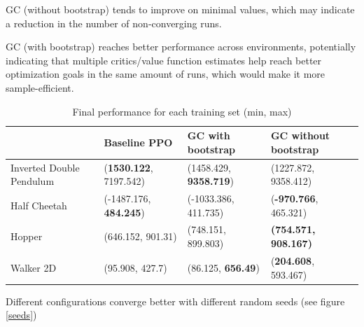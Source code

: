GC (without bootstrap) tends to improve on minimal values, which may indicate a reduction in the number of non-converging runs.

GC (with bootstrap) reaches better performance across environments, potentially indicating that multiple critics/value function estimates help reach better optimization goals in the same amount of runs, which would make it more sample-efficient.


\begin{table}
  \begin{center}
\begin{tabular}{p{}|p{}p{}p{}}
    \hline
    & Baseline PPO & GC with bootstrap & GC without bootstrap \\
    \hline
    Inverted Double Pendulum & (\textbf{1530.122}, 7197.542) & (1458.429, \textbf{9358.719}) & (1227.872, 9358.412) \\
    \hline
    Half Cheetah & (-1487.176, \textbf{484.245}) & (-1033.386, 411.735) & (\textbf{-970.766}, 465.321)\\
    \hline
    Hopper & (646.152, 901.31) & (748.151, 899.803) & \textbf{(754.571, 908.167)} \\
    \hline
    Walker 2D & (95.908, 427.7) & (86.125, \textbf{656.49}) & (\textbf{204.608}, 593.467) \\
    \hline  
\end{tabular}
  \end{center}
  \caption{Final performance for each training set (min, max)}
  \label{hyperparameters}
\end{table}

Different configurations converge better with different random seeds (see figure \ref{seeds})


